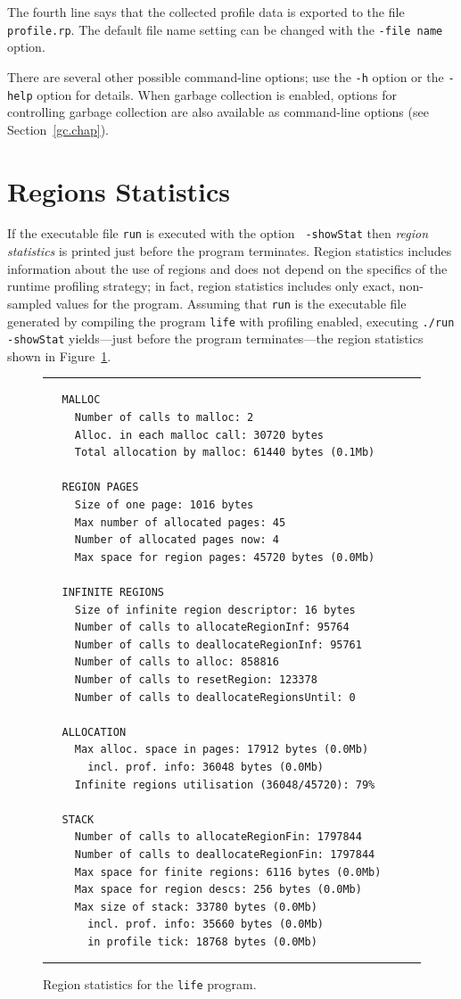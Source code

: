 \documentclass[12pt]{book}
\begin{document}
The fourth line says that the collected profile data is exported to
the file \texttt{profile.rp}. The default file name setting can be
changed with the
%
\texttt{-file name} option.

There are several other possible command-line options; use the
\texttt{-h} option or the
%
\texttt{-help} option for details. When garbage collection is enabled,
options for controlling garbage collection are also available as
command-line options (see Section~\ref{gc.chap}).

\section{Regions Statistics}
If the executable file {\tt run} is executed with the option {\tt
  -showStat} then
%
{\em region statistics\/} is printed just before the program
terminates. Region statistics includes information about the use of
regions and does not depend on the specifics of the runtime profiling
strategy; in fact, region statistics includes only exact, non-sampled
values for the program. Assuming that {\tt run} is the executable file
generated by compiling the program {\tt life} with profiling enabled,
executing {\tt ./run -showStat} yields---just before the program
terminates---the region statistics shown in
Figure~\ref{region_statistics.fig}.
\begin{figure}
\hrule \medskip
\begin{verbatim}
   MALLOC
     Number of calls to malloc: 2
     Alloc. in each malloc call: 30720 bytes
     Total allocation by malloc: 61440 bytes (0.1Mb)

   REGION PAGES
     Size of one page: 1016 bytes
     Max number of allocated pages: 45
     Number of allocated pages now: 4
     Max space for region pages: 45720 bytes (0.0Mb)

   INFINITE REGIONS
     Size of infinite region descriptor: 16 bytes
     Number of calls to allocateRegionInf: 95764
     Number of calls to deallocateRegionInf: 95761
     Number of calls to alloc: 858816
     Number of calls to resetRegion: 123378
     Number of calls to deallocateRegionsUntil: 0

   ALLOCATION
     Max alloc. space in pages: 17912 bytes (0.0Mb)
       incl. prof. info: 36048 bytes (0.0Mb)
     Infinite regions utilisation (36048/45720): 79%

   STACK
     Number of calls to allocateRegionFin: 1797844
     Number of calls to deallocateRegionFin: 1797844
     Max space for finite regions: 6116 bytes (0.0Mb)
     Max space for region descs: 256 bytes (0.0Mb)
     Max size of stack: 33780 bytes (0.0Mb)
       incl. prof. info: 35660 bytes (0.0Mb)
       in profile tick: 18768 bytes (0.0Mb)
\end{verbatim}
\caption{Region statistics for the {\tt life} program.}
\label{region_statistics.fig}
\medskip\hrule
\end{figure}
\end{document}
